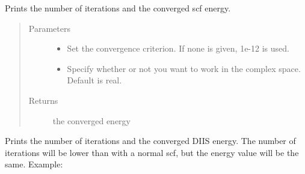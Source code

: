 \documentclass[letterpaper,10pt,english]{sphinxmanual}
\begin{document}
\begin{fulllineitems}

\begin{fulllineitems}
\label{\detokenize{RHF:hf.HartreeFock.RHF.MF.get_scf_solution}}
Prints the number of iterations and the converged scf energy.
\begin{quote}\begin{description}
\item[{Parameters}] \leavevmode\begin{itemize}
\item {} 
 \textendash{} Set the convergence criterion. If none is given, 1e-12 is used.

\item {} 
 \textendash{} Specify whether or not you want to work in the complex space. Default is real.

\end{itemize}

\item[{Returns}] \leavevmode
the converged energy

\end{description}\end{quote}

\end{fulllineitems}


\begin{fulllineitems}
\label{\detokenize{RHF:hf.HartreeFock.RHF.MF.get_scf_solution_diis}}
Prints the number of iterations and the converged DIIS energy. The number of iterations will be lower than with
a normal scf, but the energy value will be the same. Example:


\end{fulllineitems}
\end{fulllineitems}
\end{document}
